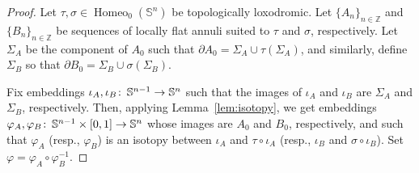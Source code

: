 \documentclass[microtype]{gtpart}
\newcommand{\bz}{\mathbb Z}
\newcommand{\vp}{\varphi}
\DeclareMathOperator{\Homeo}{Homeo}
\renewcommand{\co}{\colon\thinspace}
\theoremstyle{definition}
\numberwithin{equation}{section}
\newcommand{\nv}[1]{\color{Cerulean}  \{NV: #1\}\color{black}}
\begin{document}
\begin{proof}
Let \( \tau, \sigma \in \Homeo_0(\mathbb S^n) \) be topologically loxodromic. 
Let \( \{ A_n\}_{n\in\bz} \) and \( \{ B_n\}_{n\in\bz} \) be sequences of locally flat annuli suited to \( \tau \) and \( \sigma \), respectively. 
Let \( \Sigma_A \) be the component of \( A_0 \) such that \( \partial A_0 = \Sigma_A \cup \tau(\Sigma_A) \), and similarly, define \( \Sigma_B \) so that \( \partial B_0 = \Sigma_B \cup \sigma(\Sigma_B) \). 

Fix embeddings \( \iota_A, \iota_B \co \mathbb S^{n-1} \to \mathbb S^n \) such that the images of \( \iota_A \) and \( \iota_B \) are \( \Sigma_A \) and \( \Sigma_B \), respectively. 
Then, applying Lemma~\ref{lem:isotopy}, we get embeddings \( \vp_A, \vp_B \co \mathbb S^{n-1}\times [0,1] \to \mathbb S^n \) whose images are \( A_0 \) and \( B_0 \), respectively, and such that \( \vp_A \) (resp., \( \vp_B \)) is an isotopy between \( \iota_A \) and \( \tau\circ \iota_A \) (resp., \( \iota_B \) and \( \sigma \circ \iota_B \)).  
Set \( \vp = \vp_A \circ \vp_B^{-1} \). 



\end{proof}
\end{document}
